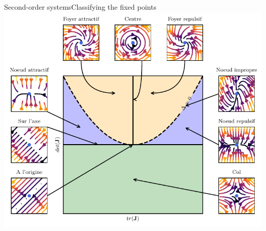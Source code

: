 \documentclass[usenames,dvipsnames,svgnames,10pt,aspectratio=169]{beamer}
\begin{document}
\begin{frame}[t, c]{Second-order systems}{Classifying the fixed points}
	\vspace{-0.5cm}
	\centering
	\includegraphics[height=.8\textheight]{fixed_points_classification}

\end{frame}
\end{document}
